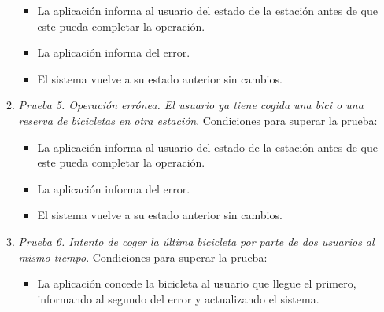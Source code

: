 \begin{itemize}
\begin{enumerate}
		\begin{itemize}
			\item La aplicación informa al usuario del estado de la estación antes de que este pueda completar la operación.
			\item La aplicación informa del error.
			\item El sistema vuelve a su estado anterior sin cambios.
		\end{itemize}
		\item \textit{Prueba 5. Operación errónea. El usuario ya tiene cogida una bici o una reserva de bicicletas en otra estación}. Condiciones para superar la prueba:
		\begin{itemize}
			\item La aplicación informa al usuario del estado de la estación antes de que este pueda completar la operación.
			\item La aplicación informa del error.
			\item El sistema vuelve a su estado anterior sin cambios.
		\end{itemize}
		\item \textit{Prueba 6. Intento de coger la última bicicleta por parte de dos usuarios al mismo tiempo}. Condiciones para superar la prueba:
		\begin{itemize}
			\item La aplicación concede la bicicleta al usuario que llegue el primero, informando al segundo del error y actualizando el sistema.
		\end{itemize}
	\end{enumerate}
	

\end{itemize}
